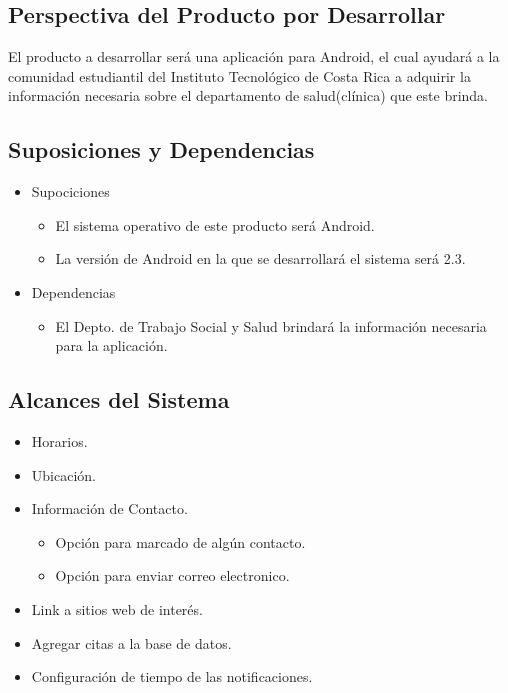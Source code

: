 \documentclass[12pt]{article}
\begin{document}
\subsection{Perspectiva del Producto por Desarrollar}
El producto a desarrollar ser\'a una aplicaci\'on para Android, el cual ayudar\'a a la comunidad estudiantil del Instituto Tecnol\'ogico de Costa Rica a adquirir la informaci\'on necesaria sobre el departamento de salud(cl\'inica) que este brinda.

\subsection{Suposiciones y Dependencias}

\begin{itemize}

\item{Supociciones}
\begin{itemize}
	\item{El sistema operativo de este producto ser\'a Android.}
	\item{La versi\'on de Android en la que se desarrollar\'a el sistema ser\'a 2.3.}
\end{itemize}

\item{Dependencias}
\begin{itemize}
	\item{El Depto. de Trabajo Social y Salud brindar\'a la informaci\'on necesaria para la aplicaci\'on.}
\end{itemize}

\end{itemize}

\subsection{Alcances del Sistema}

\begin{itemize}
	\item{Horarios.}
	\item{Ubicaci\'on.}
	\item{Informaci\'on de Contacto.}
	\begin{itemize}
		\item{Opci\'on para marcado de alg\'un contacto.}
		\item{Opci\'on para enviar correo electronico.}
	\end{itemize}
	\item{Link a sitios web de inter\'es.}
	\item{Agregar citas a la base de datos.}
	\item{Configuraci\'on de tiempo de las notificaciones.}
\end{itemize}
\end{document}
